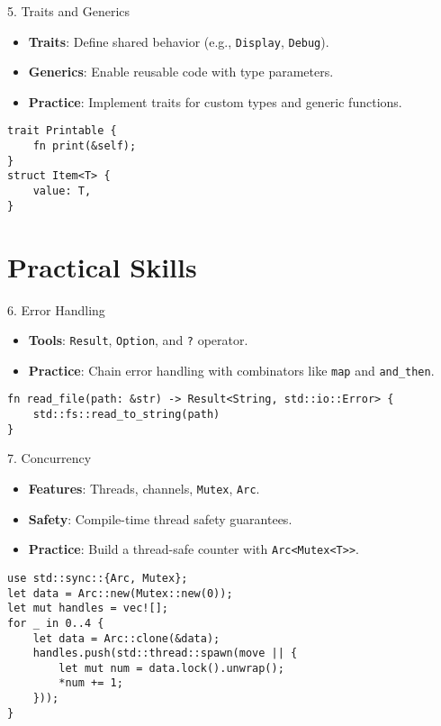 \documentclass[10pt]{beamer}
\begin{document}
\begin{frame}{5. Traits and Generics}
    \begin{itemize}
        \item \textbf{Traits}: Define shared behavior (e.g., \texttt{Display}, \texttt{Debug}).
        \item \textbf{Generics}: Enable reusable code with type parameters.
        \item \textbf{Practice}: Implement traits for custom types and generic functions.
    \end{itemize}
    \begin{lstlisting}
trait Printable {
    fn print(&self);
}
struct Item<T> {
    value: T,
}
    \end{lstlisting}
\end{frame}

\section{Practical Skills}
\begin{frame}{6. Error Handling}
    \begin{itemize}
        \item \textbf{Tools}: \texttt{Result}, \texttt{Option}, and \texttt{?} operator.
        \item \textbf{Practice}: Chain error handling with combinators like \texttt{map} and \texttt{and\_then}.
    \end{itemize}
    \begin{lstlisting}
fn read_file(path: &str) -> Result<String, std::io::Error> {
    std::fs::read_to_string(path)
}
    \end{lstlisting}
\end{frame}

\begin{frame}{7. Concurrency}
    \begin{itemize}
        \item \textbf{Features}: Threads, channels, \texttt{Mutex}, \texttt{Arc}.
        \item \textbf{Safety}: Compile-time thread safety guarantees.
        \item \textbf{Practice}: Build a thread-safe counter with \texttt{Arc<Mutex<T>>}.
    \end{itemize}
    \begin{lstlisting}
use std::sync::{Arc, Mutex};
let data = Arc::new(Mutex::new(0));
let mut handles = vec![];
for _ in 0..4 {
    let data = Arc::clone(&data);
    handles.push(std::thread::spawn(move || {
        let mut num = data.lock().unwrap();
        *num += 1;
    }));
}
    \end{lstlisting}
\end{frame}
\end{document}
